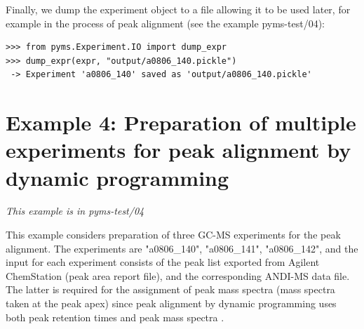 Finally, we dump the experiment object to a file allowing it to be used
later, for example in the process of peak alignment (see the example
pyms-test/04):

\begin{verbatim}
>>> from pyms.Experiment.IO import dump_expr
>>> dump_expr(expr, "output/a0806_140.pickle")
 -> Experiment 'a0806_140' saved as 'output/a0806_140.pickle'
\end{verbatim}

\section{Example 4: Preparation of multiple experiments for peak alignment
by dynamic programming}

\noindent
{\em This example is in pyms-test/04}

This example considers preparation of three GC-MS experiments for the
peak alignment. The experiments are "a0806\_140", "a0806\_141",
"a0806\_142", and the input for each experiment consists of the
peak list exported from Agilent ChemStation (peak area report file),
and the corresponding ANDI-MS data file. The latter is required for
the assignment of peak mass spectra (mass spectra taken at the peak
apex) since peak alignment by dynamic programming uses both peak
retention times and peak mass spectra \cite{Robinson07}.



